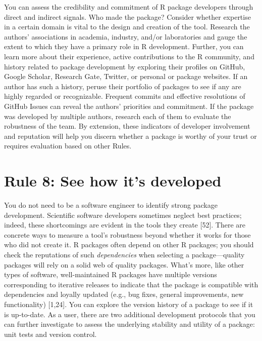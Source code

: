 \documentclass[10pt,letterpaper]{article}
\begin{document}
You can assess the credibility and commitment of R package developers
through direct and indirect signals. Who made the package? Consider
whether expertise in a certain domain is vital to the design and
creation of the tool. Research the authors' associations in academia,
industry, and/or laboratories and gauge the extent to which they have a
primary role in R development. Further, you can learn more about their
experience, active contributions to the R community, and history related
to package development by exploring their profiles on GitHub, Google
Scholar, Research Gate, Twitter, or personal or package websites. If an
author has such a history, peruse their portfolio of packages to see if
any are highly regarded or recognizable. Frequent commits and effective
resolutions of GitHub Issues can reveal the authors' priorities and
commitment. If the package was developed by multiple authors, research
each of them to evaluate the robustness of the team. By extension, these
indicators of developer involvement and reputation will help you discern
whether a package is worthy of your trust or requires evaluation based
on other Rules.

\hypertarget{rule-8-see-how-its-developed}{%
\section{Rule 8: See how it's
developed}\label{rule-8-see-how-its-developed}}

You do not need to be a software engineer to identify strong package
development. Scientific software developers sometimes neglect best
practices; indeed, these shortcomings are evident in the tools they
create {[}52{]}. There are concrete ways to measure a tool's robustness
beyond whether it works for those who did not create it. R packages
often depend on other R packages; you should check the reputations of
such \emph{dependencies} when selecting a package---quality packages
will rely on a solid web of quality packages. What's more, like other
types of software, well-maintained R packages have multiple versions
corresponding to iterative releases to indicate that the package is
compatible with dependencies and loyally updated (e.g., bug fixes,
general improvements, new functionality) {[}1,24{]}. You can explore the
version history of a package to see if it is up-to-date. As a user,
there are two additional development protocols that you can further
investigate to assess the underlying stability and utility of a package:
unit tests and version control.
\end{document}
